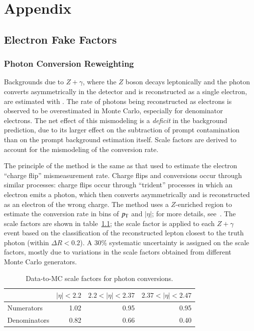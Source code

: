 \chapter{Appendix}

\section{Electron Fake Factors}

\subsection{Photon Conversion Reweighting}\label{sec:conversion-reweighting}
Backgrounds due to $Z+\gamma$, where the $Z$ boson decays leptonically and the photon converts asymmetrically in the detector and is reconstructed as a single electron, are estimated with \sherpa. The rate of photons being reconstructed as electrons is observed to be overestimated in Monte Carlo, especially for denominator electrons. The net effect of this mismodeling is a \emph{deficit} in the background prediction, due to its larger effect on the subtraction of prompt contamination than on the prompt background estimation itself. Scale factors are derived to account for the mismodeling of the conversion rate. 

The principle of the method is the same as that used to estimate the electron ``charge flip'' mismeasurement rate. Charge flips and conversions occur through similar processes: charge flips occur through ``trident'' processes in which an electron emits a photon, which then converts asymmetrically and is reconstructed as an electron of the wrong charge. The method uses a $Z$-enriched region to estimate the conversion rate in bins of $p_{\text{T}}$ and $|\eta|$; for more details, see~\cite{DeViveiros:1670929}. The scale factors are shown in table~\ref{table:conversion-sfs}; the scale factor is applied to each $Z+\gamma$ event based on the classification of the reconstructed lepton closest to the truth photon (within $\Delta R<0.2$). A $30\%$ systematic uncertainty is assigned on the scale factors, mostly due to variations in the scale factors obtained from different Monte Carlo generators. 

\begin{table}[tbp]
  \centering
  \begin{tabular}{l r r r}
					 &$|\eta|<2.2$     &$2.2<|\eta|<2.37$     &$2.37<|\eta|<2.47$\\
	\hline
	Numerators       &1.02             &0.95                  &0.95\\
	Denominators     &0.82             &0.66                  &0.40\\
  \end{tabular}
  \caption{Data-to-MC scale factors for photon conversions.}
  \label{table:conversion-sfs}
\end{table}

